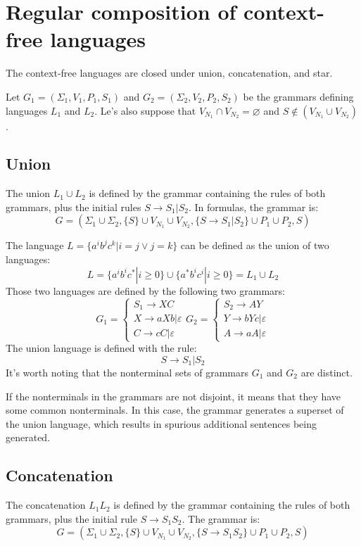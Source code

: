 \section{Regular composition of context-free languages}

The context-free languages are closed under union, concatenation, and star. 

Let $G_1=(\Sigma_1,V_1,P_1,S_1)$ and $G_2=(\Sigma_2,V_2,P_2,S_2)$ be the grammars defining languages $L_1$ and $L_2$. 
Le's also suppose that $V_{N_1} \cap V_{N_2}=\varnothing$ and $S \notin (V_{N_1} \cup V_{N_2})$. 

\subsection*{Union}
The union $L_1 \cup L_2$ is defined by the grammar containing the rules of both grammars, plus the initial rules $S\rightarrow S_1|S_2$. In formulas, the grammar is: 
\[G=\left(\Sigma_1 \cup \Sigma_2,\{S\} \cup V_{N_1} \cup V_{N_2},\{S\rightarrow S_1|S_2\} \cup P_1 \cup P_2,S\right)\]

\begin{example}
    The language $L=\{a^ib^jc^k|i=j \lor j=k\}$ can be defined as the union of two languages:
    \[L=\{a^ib^ic^{*}|i \geq 0\} \cup \{a^{*}b^ic^i|i \geq 0\}=L_1 \cup L_2\]
    Those two languages are defined by the following two grammars: 
    \[
    G_1=
    \begin{cases}
        S_1 \rightarrow XC \\
        X \rightarrow aXb|\varepsilon \\
        C \rightarrow cC|\varepsilon
    \end{cases}    
    G_2=
    \begin{cases}
        S_2 \rightarrow AY \\
        Y \rightarrow bYc|\varepsilon \\
        A \rightarrow aA|\varepsilon
    \end{cases}  
    \]
    The union language is defined with the rule: 
    \[S \rightarrow S_1|S_2\]
    It's worth noting that the nonterminal sets of grammars $G_1$ and $G_2$ are distinct.
\end{example}
If the nonterminals in the grammars are not disjoint, it means that they have some common nonterminals. 
In this case, the grammar generates a superset of the union language, which results in spurious additional sentences being generated.

\subsection*{Concatenation}
The concatenation $L_1L_2$ is defined by the grammar containing the rules of both grammars, plus the initial rule $S\rightarrow S_1S_2$. The grammar is: 
\[G=\left(\Sigma_1 \cup \Sigma_2,\{S\} \cup V_{N_1} \cup V_{N_2},\{S\rightarrow S_1S_2\} \cup P_1 \cup P_2,S\right)\] 

